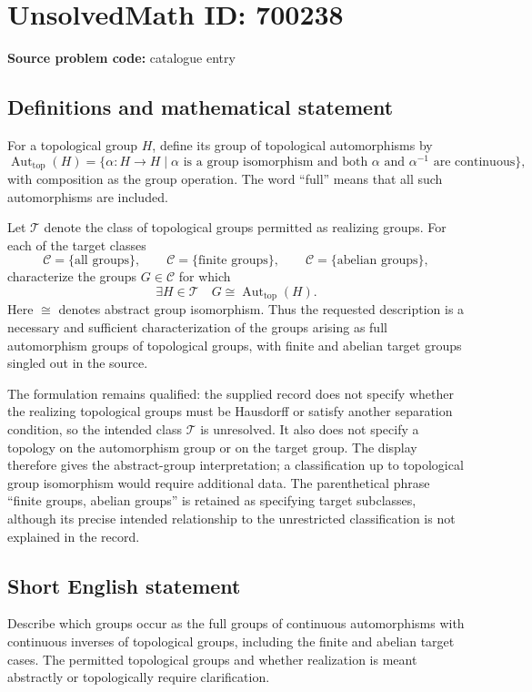 \documentclass[11pt]{article}
\begin{document}
\section*{UnsolvedMath ID: 700238}
\textbf{Source problem code:} catalogue entry
\subsection{Definitions and mathematical statement}
For a topological group \(H\), define its group of topological automorphisms by
\[
\operatorname{Aut}_{\mathrm{top}}(H)
=\{\alpha:H\to H\mid \alpha\text{ is a group isomorphism and both }\alpha\text{ and }\alpha^{-1}\text{ are continuous}\},
\]
with composition as the group operation. The word ``full'' means that all such automorphisms are included.

Let \(\mathcal T\) denote the class of topological groups permitted as realizing groups. For each of the target classes
\[
\mathcal C=\{\text{all groups}\},\qquad
\mathcal C=\{\text{finite groups}\},\qquad
\mathcal C=\{\text{abelian groups}\},
\]
characterize the groups \(G\in\mathcal C\) for which
\[
\exists H\in\mathcal T\quad G\cong\operatorname{Aut}_{\mathrm{top}}(H).
\]
Here \(\cong\) denotes abstract group isomorphism. Thus the requested description is a necessary and sufficient characterization of the groups arising as full automorphism groups of topological groups, with finite and abelian target groups singled out in the source.

The formulation remains qualified: the supplied record does not specify whether the realizing topological groups must be Hausdorff or satisfy another separation condition, so the intended class \(\mathcal T\) is unresolved. It also does not specify a topology on the automorphism group or on the target group. The display therefore gives the abstract-group interpretation; a classification up to topological group isomorphism would require additional data. The parenthetical phrase ``finite groups, abelian groups'' is retained as specifying target subclasses, although its precise intended relationship to the unrestricted classification is not explained in the record.
\subsection{Short English statement}
Describe which groups occur as the full groups of continuous automorphisms with continuous inverses of topological groups, including the finite and abelian target cases. The permitted topological groups and whether realization is meant abstractly or topologically require clarification.
\end{document}
